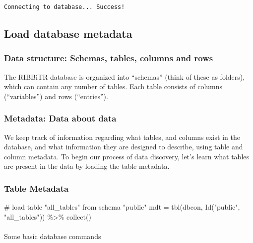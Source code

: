 \documentclass[
  letterpaper,
  DIV=11,
  numbers=noendperiod]{scrartcl}
\makeatletter
\let\oldparagraph\paragraph
\renewcommand{\paragraph}{
    \@ifstar
      \xxxParagraphStar
      \xxxParagraphNoStar
  }
\newcommand{\xxxParagraphStar}[1]{\oldparagraph*{#1}\mbox{}}
\newcommand{\xxxParagraphNoStar}[1]{\oldparagraph{#1}\mbox{}}
\newenvironment{Shaded}{\begin{snugshade}}{\end{snugshade}}
\newcommand{\CommentTok}[1]{\textcolor[rgb]{0.37,0.37,0.37}{#1}}
\newcommand{\FunctionTok}[1]{\textcolor[rgb]{0.28,0.35,0.67}{#1}}
\newcommand{\NormalTok}[1]{\textcolor[rgb]{0.00,0.23,0.31}{#1}}
\newcommand{\OtherTok}[1]{\textcolor[rgb]{0.00,0.23,0.31}{#1}}
\newcommand{\SpecialCharTok}[1]{\textcolor[rgb]{0.37,0.37,0.37}{#1}}
\newcommand{\StringTok}[1]{\textcolor[rgb]{0.13,0.47,0.30}{#1}}
\makeatother
\begin{document}
\begin{verbatim}
Connecting to database... Success!
\end{verbatim}

\subsection{Load database metadata}\label{load-database-metadata}

\subsubsection{Data structure: Schemas, tables, columns and
rows}\label{data-structure-schemas-tables-columns-and-rows}

The RIBBiTR database is organized into ``schemas'' (think of these as
folders), which can contain any number of tables. Each table consists of
columns (``variables'') and rows (``entries'').

\subsubsection{Metadata: Data about
data}\label{metadata-data-about-data}

We keep track of information regarding what tables, and columns exist in
the database, and what information they are designed to describe, using
table and column metadata. To begin our process of data discovery, let's
learn what tables are present in the data by loading the table metadata.

\subsubsection{Table Metadata}\label{table-metadata}

\begin{Shaded}
\begin{Highlighting}[]
\CommentTok{\# load table "all\_tables" from schema "public"}
\NormalTok{mdt }\OtherTok{=} \FunctionTok{tbl}\NormalTok{(dbcon, }\FunctionTok{Id}\NormalTok{(}\StringTok{"public"}\NormalTok{, }\StringTok{"all\_tables"}\NormalTok{)) }\SpecialCharTok{\%\textgreater{}\%}
  \FunctionTok{collect}\NormalTok{()}
\end{Highlighting}
\end{Shaded}

\paragraph{Some basic database
commands}\label{some-basic-database-commands}
\end{document}
